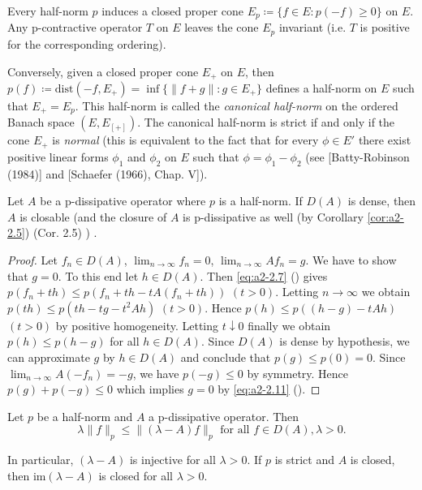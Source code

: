 \begin{remark}\label{rem:a2-2.8}
Every half-norm $p$ induces a closed proper cone 
$E_{p} \coloneqq \{f \in E \colon p(-f) \geq 0\}$ on $E$.
Any p-contractive operator $T$ on $E$ leaves the cone $E_{p}$ invariant (i.e. $T$ is positive for the corresponding ordering).

Conversely, given a closed proper cone $E_{+}$ on $E$, then 
$p(f) \coloneqq \text{dist}(-f,E_{+}) = \inf\{\|f + g\| \colon g \in E_{+}\}$ defines a half-norm on $E$ such that $E_{+} = E_{p}$.
This half-norm is called the \emph{canonical half-norm} on the ordered Banach space $(E,E_[+])$.
The canonical half-norm is strict if and only if the cone $E_{+}$ is \emph{normal} (this is equivalent to the fact that for every $\phi \in E'$ there exist positive linear forms $\phi_{1}$ and $\phi_{2}$ on $E$ such that $\phi = \phi_{1} - \phi_{2}$ (see [Batty-Robinson (1984)] and [Schaefer (1966), Chap. V]).
\end{remark}
\begin{proposition}\label{prop:a2-2.9}
Let $A$ be a p-dissipative operator where $p$ is a half-norm.
If $D(A)$ is dense, then $A$ is closable (and the closure of $A$ is p-dissipative as well (by Corollary \ref{cor:a2-2.5}) (\lnm Cor. 2.5) ) .
\end{proposition}

\begin{proof}
Let $f_n \in D(A)$, $\lim_{n \to \infty} f_{n} = 0$, $\lim_{n \to \infty} Af_{n} = g$.
We have to show that $g = 0$.
To this end let $h \in D(A)$.
Then \eqref{eq:a2-2.7} () 
gives $p(f_{n} + th) \leq p(f_{n} + th - tA(f_{n} + th))$ $(t > 0)$.
Letting $n \to \infty$ we obtain 
$p(th) \leq p(th - tg - t^{2}Ah)$ \quad $(t > 0)$.
Hence $p(h) \leq p((h-g) - tAh)$ $(t > 0)$ by positive homogeneity.
Letting $t \downarrow 0$ finally we obtain $p(h) \leq p(h - g)$ for all $h \in D(A)$.
Since $D(A)$ is dense by hypothesis, we can approximate $g$ by $h \in D(A)$ and conclude that $p(g) \leq p(0) = 0$.
Since $\lim_{n\to\infty} A(-f_{n}) = -g$, we have $p(-g) \leq 0$ by symmetry.
Hence $p(g) + p(-g) \leq 0$ which implies $g = 0$ by \eqref{eq:a2-2.11} ().
\end{proof}

\begin{lemma}\label{lem:a2-2.10}
Let $p$ be a half-norm and $A$ a p-dissipative operator.
Then
\begin{equation}\label{eq:a2-2.14}
\lambda\|f\|_{p} \leq \|(\lambda - A)f\|_{p} \text{ for all } f \in D(A), \lambda > 0.
\end{equation}

In particular, $(\lambda-A)$ is injective for all $\lambda > 0$.
If $p$ is strict and $A$ is closed, then $\text{im}(\lambda - A)$ is closed for all $\lambda > 0$.
\end{lemma}

